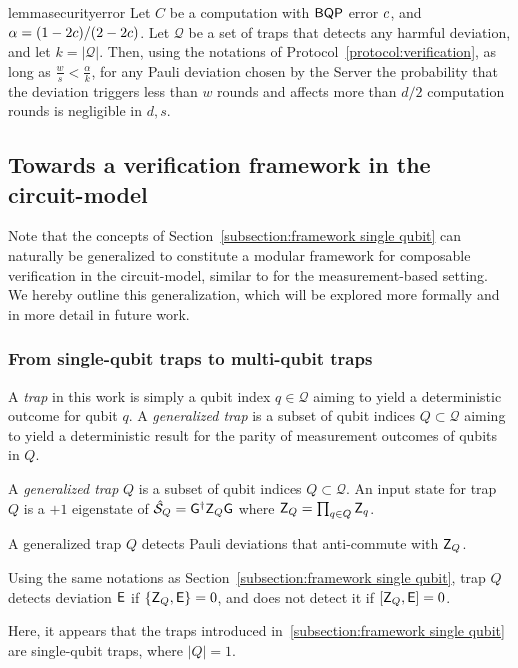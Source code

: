 \begin{restatable}{lemma}{securityerror}
    \label{lemma:security error}
    Let $C$ be a computation with $\textsf{BQP}$ error $c$, and $\alpha=(1-2c)/(2-2c)$.
    Let $\mathcal Q$ be a set of traps that detects any harmful deviation, and let $k=|\mathcal Q|$.
    Then, using the notations of Protocol~\ref{protocol:verification}, as long as $\tfrac w s< \tfrac\alpha k$,
     for any Pauli deviation chosen by the Server the
    probability that the deviation triggers less than $w$ rounds and affects more than $d/2$ computation rounds is negligible in $d, s$.
\end{restatable}

\subsection{Towards a verification framework in the circuit-model
}
\label{subsection:framework generalized}
Note that the concepts of Section~\ref{subsection:framework single qubit} can naturally be generalized to constitute a modular framework for composable verification in the circuit-model, similar to \cite{KKLM22unifying} for the measurement-based setting. We hereby outline this generalization, which will be explored more formally and in more detail in future work.

\subsubsection{From single-qubit traps to multi-qubit traps}
A \emph{trap} in this work is simply a qubit index $q\in \mathcal Q$ aiming to yield a deterministic outcome for qubit $q$. A \emph{generalized trap} is a subset of qubit indices $Q\subset \mathcal Q$ aiming to yield a deterministic result for the parity of measurement outcomes of qubits in $Q$.
\begin{definition}
    A \emph{generalized trap} $Q$ is a subset of qubit indices $Q\subset \mathcal Q$. An input state for trap $Q$ is a $+1$ eigenstate of $\hat{\mathcal{S}}_Q=\mathsf{G}^\dagger \mathsf{Z}_Q\mathsf{G}$ where $\mathsf{Z}_Q = \prod_{q\in Q} \mathsf{Z}_{q}$.
\end{definition}

A generalized trap $Q$ detects Pauli deviations that anti-commute with $\mathsf{Z}_Q$.
\begin{definition}
    Using the same notations as Section~\ref{subsection:framework single qubit}, trap $Q$ detects deviation $\mathsf{E}$ if $\{\mathsf{Z}_Q, \mathsf{E}\}=0$, and does not detect it if $[\mathsf{Z}_Q, \mathsf{E}]=0$.
\end{definition}
Here, it appears that the traps introduced in~\ref{subsection:framework single qubit} are single-qubit traps, where $|Q|=1$.
